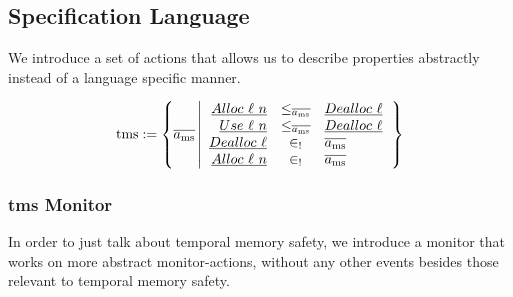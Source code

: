 \subsection{Specification Language}

We introduce a set of actions that allows us to describe properties abstractly instead of a language specific manner.



\begin{definition}\label{def:tms}\label{def:tempmemsafe}
  $$
  \text{tms}:=\left\{\trace[_{\mssafe}] \left| \begin{array}{rcl}
    \specificev{Alloc\ \loc\ n}&\le_{\trace[_{\mssafe}]}&\specificev{Dealloc\ \loc} \\
    \specificev{Use\ \loc\ n}&\le_{\trace[_{\mssafe}]}&\specificev{Dealloc\ \loc} \\
    \specificev{Dealloc\ \loc}&\in_{!}&\trace[_{\mssafe}] \\
    \specificev{Alloc\ \loc\ n}&\in_{!}&\trace[_{\mssafe}] \\
  \end{array}\right.\right\}
  $$
\end{definition}

\subsubsection{\gls*{tms} Monitor}
In order to just talk about temporal memory safety, we introduce a monitor that works on more abstract monitor-actions, without any other events besides those relevant to temporal memory safety.

